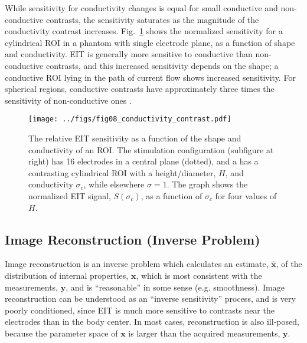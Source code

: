 \documentclass[12pt]{article} \usepackage[margin=3cm]{geometry} \usepackage[margin=20pt,font=small,labelfont=bf]{caption}\def\TBLWIDA{35mm}\def\TBLWIDB{95mm}
\newcommand\Fref[1]{Fig.\ \ref{#1}}
\newcommand{\xB}{\mathbf{x}}
\newcommand{\xH}{\hat{\mathbf{x}}}
\newcommand{\yB}{\mathbf{y}}
\begin{document}
While sensitivity for conductivity changes is equal
for small conductive and non-conductive contrasts, the
sensitivity saturates as the magnitude of the
conductivity contrast increases.
\Fref{fig:perturbation_sensitivity} shows the 
normalized sensitivity for a cylindrical ROI in a
phantom with single electrode plane, as a function of
shape and conductivity.
 EIT is generally more sensitive
to conductive than non-conductive contrasts, and this
increased sensitivity
depends on the shape; a conductive ROI lying in the path
of current flow shows increased sensitivity.
For spherical regions, conductive contrasts have approximately
three times the sensitivity of non-conductive
ones \cite{Adler2015Perturbations}.

\begin{figure} \centering
   \texttt{[image: ../figs/fig08\_conductivity\_contrast.pdf]}
\caption{%
The relative EIT sensitivity as a function of the shape and
conductivity of an ROI. The stimulation configuration (subfigure at right)
has 16 electrodes in a central plane (dotted), and a 
has a contrasting cylindrical ROI with a height/diameter, $H$, and conductivity 
$\sigma_c$, while elsewhere $\sigma=1$.
The graph shows the
normalized EIT signal, $S(\sigma_c)$, as a function of
$\sigma_c$ for four values of $H$.
}
\label{fig:perturbation_sensitivity}
\end{figure}

\subsection{Image Reconstruction (Inverse Problem)}

Image reconstruction is an inverse problem which calculates
an estimate, $\xH$, of 
the distribution of internal properties, $\xB$, which is most consistent
with the measurements, $\yB$, and is ``reasonable'' in some sense (e.g. smoothness). 
Image reconstruction can be understood as an ``inverse sensitivity''
process, and is very poorly conditioned, since EIT is much more
sensitive to contrasts near the electrodes than in the body center.
In most cases, reconstruction is also ill-posed, because the
parameter space of $\xB$ is larger than the acquired measurements, $\yB$.
\end{document}
